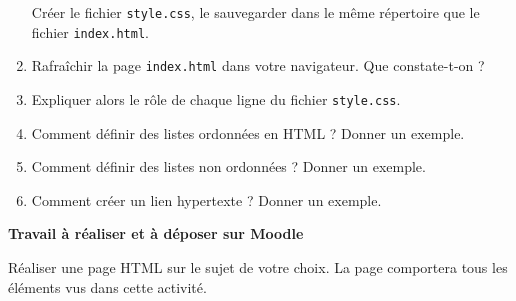 \documentclass[a4paper]{article}
\begin{document}
\begin{enumerate}
\begin{enumerate}
\begin{center}
	\end{center}
    \end{enumerate}
    Créer le fichier \verb|style.css|, le sauvegarder dans le même répertoire que le fichier \verb|index.html|.
  \item Rafraîchir la page \verb|index.html| dans votre navigateur. Que constate-t-on ?
  \item Expliquer alors le rôle de chaque ligne du fichier \verb|style.css|.
  \item Comment définir des listes ordonnées en HTML ? Donner un exemple.
  \item Comment définir des listes non ordonnées ? Donner un exemple.
  \item Comment créer un lien hypertexte ? Donner un exemple.
\end{enumerate}

\bigskip

\textbf{Travail à réaliser et à déposer sur Moodle}

\medskip

Réaliser une page HTML sur le sujet de votre choix. La page comportera tous les éléments vus dans cette activité.
\end{document}
